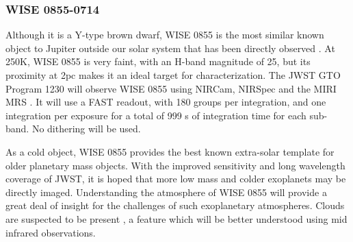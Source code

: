 \subsubsection{WISE 0855-0714}
Although it is a Y-type brown dwarf, WISE 0855 is the most similar known object to Jupiter outside our solar system that has been directly observed \parencite{Luhman2014}. 
At 250K, WISE 0855 is very faint, with an H-band magnitude of 25, but its proximity at 2pc makes it an ideal target for characterization.
The JWST GTO Program 1230 will observe WISE 0855 using NIRCam, NIRSpec and the MIRI MRS \parencite{Oliveira2019}.
It will use a FAST readout, with 180 groups per integration, and one integration per exposure for a total of 999 s of integration time for each sub-band. No dithering will be used.

As a cold object, WISE 0855 provides the best known extra-solar template for older planetary mass objects.
With the improved sensitivity and long wavelength coverage of JWST, it is hoped that more low mass and colder exoplanets may be directly imaged.
Understanding the atmosphere of WISE 0855 will provide a great deal of insight for the challenges of such exoplanetary atmospheres. 
Clouds are suspected to be present \parencite{Faherty2018}, a feature which will be better understood using mid infrared observations.

